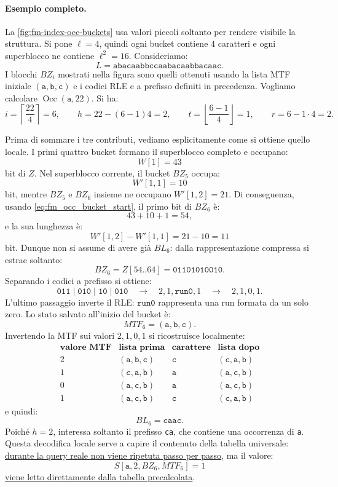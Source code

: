 \documentclass{article}
\theoremstyle{definition}
\numberwithin{equation}{section}
\begin{document}
\paragraph{Esempio completo.}
La \autoref{fig:fm-index-occ-buckets} usa valori piccoli soltanto per rendere visibile la struttura. Si pone $\ell=4$, quindi ogni bucket contiene $4$ caratteri e ogni superblocco ne contiene $\ell^2=16$. Consideriamo:
\[
    L=\texttt{abacaabbccaabacaabbacaac}.
\]
I blocchi $BZ_i$ mostrati nella figura sono quelli ottenuti usando la lista MTF iniziale $(\texttt{a},\texttt{b},\texttt{c})$ e i codici RLE e a prefisso definiti in precedenza.
Vogliamo calcolare $\operatorname{Occ}(\texttt{a},22)$. Si ha:
\[
    i=\left\lceil\frac{22}{4}\right\rceil=6,
    \qquad
    h=22-(6-1)4=2,
    \qquad
    t=\left\lfloor\frac{6-1}{4}\right\rfloor=1,
    \qquad
    r=6-1\cdot4=2.
\]

Prima di sommare i tre contributi, vediamo esplicitamente come si ottiene quello locale. I primi quattro bucket formano il superblocco completo e occupano:
\[
    W[1]=43
\]
bit di $Z$. Nel superblocco corrente, il bucket $BZ_5$ occupa:
\[
    W'[1,1]=10
\]
bit, mentre $BZ_5$ e $BZ_6$ insieme ne occupano $W'[1,2]=21$. Di conseguenza, usando \eqref{eq:fm_occ_bucket_start}, il primo bit di $BZ_6$ è:
\[
    43+10+1=54,
\]
e la sua lunghezza è:
\[
    W'[1,2]-W'[1,1]=21-10=11
\]
bit. Dunque non si assume di avere già $BL_6$: dalla rappresentazione compressa si estrae soltanto:
\[
    BZ_6
    =
    Z[54..64]
    =
    \texttt{01101010010}.
\]
Separando i codici a prefisso si ottiene:
\[
    \texttt{011}\mid\texttt{010}\mid\texttt{10}\mid\texttt{010}
    \quad\longrightarrow\quad
    2,1,\mathtt{run0},1
    \quad\longrightarrow\quad
    2,1,0,1.
\]
L'ultimo passaggio inverte il RLE: $\mathtt{run0}$ rappresenta una run formata da un solo zero. Lo stato salvato all'inizio del bucket è:
\[
    MTF_6=(\texttt{a},\texttt{b},\texttt{c}).
\]
Invertendo la MTF sui valori $2,1,0,1$ si ricostruisce localmente:
\[
    \begin{array}{c|c|c|c}
        \textbf{valore MTF} & \textbf{lista prima}               & \textbf{carattere} & \textbf{lista dopo}                \\
        \hline
        2                   & (\texttt{a},\texttt{b},\texttt{c}) & \texttt{c}         & (\texttt{c},\texttt{a},\texttt{b}) \\
        1                   & (\texttt{c},\texttt{a},\texttt{b}) & \texttt{a}         & (\texttt{a},\texttt{c},\texttt{b}) \\
        0                   & (\texttt{a},\texttt{c},\texttt{b}) & \texttt{a}         & (\texttt{a},\texttt{c},\texttt{b}) \\
        1                   & (\texttt{a},\texttt{c},\texttt{b}) & \texttt{c}         & (\texttt{c},\texttt{a},\texttt{b})
    \end{array}
\]
e quindi:
\[
    BL_6=\texttt{caac}.
\]
Poiché $h=2$, interessa soltanto il prefisso \texttt{ca}, che contiene una occorrenza di \texttt{a}. Questa decodifica locale serve a capire il contenuto della tabella universale: \uline{durante la query reale non viene ripetuta passo per passo}, ma il valore:
\[
    S[\texttt{a},2,BZ_6,MTF_6]=1
\]
\uline{viene letto direttamente dalla tabella precalcolata}.
\end{document}

